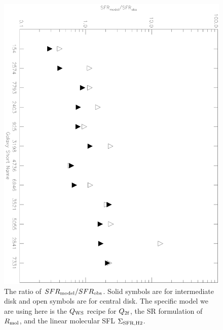 \documentclass[12pt,preprint]{aastex}
\begin{document}
\begin{figure}
\begin{center}
\includegraphics[angle=90,scale=0.7]{SFR_ratio.eps} \caption{The ratio of $SFR_{\rm model}/SFR_{\rm obs}$. Solid symbols are for intermediate disk and open symbols are for central disk. The specific model we are using here is the $Q_{\rm WS}$ recipe for $Q_{\rm 2f}$, the SR formulation of $R_{\rm mol}$, and the linear molecular SFL $\Sigma_{\rm SFR,H2}$. 
}
\label{SFR_ratio}
\end{center}
\end{figure}
\end{document}
